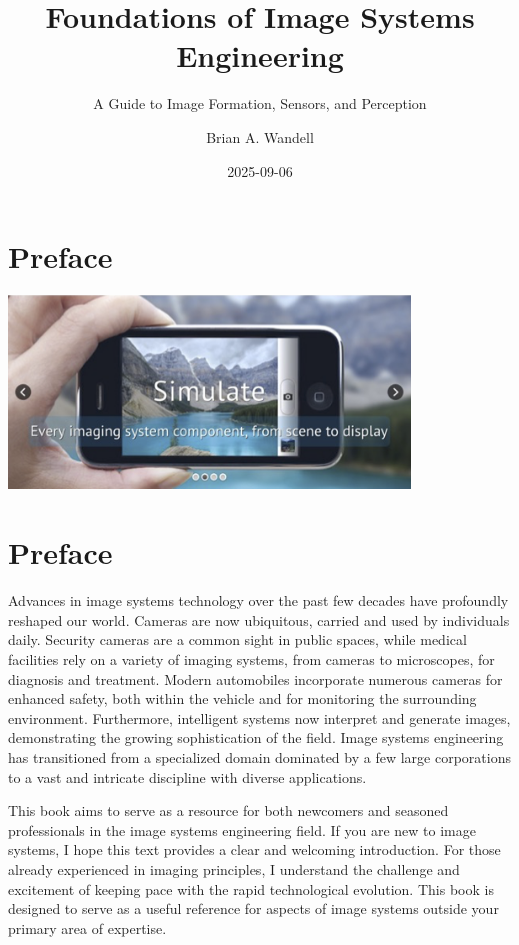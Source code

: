 \documentclass[
  letterpaper,
]{book}
\title{Foundations of Image Systems Engineering}
\subtitle{A Guide to Image Formation, Sensors, and Perception}
\author{Brian A. Wandell}
\date{2025-09-06}
\renewcommand*\contentsname{Table of contents}
\newcommand\contentsname{Table of contents}
\begin{document}
\frontmatter
\maketitle

\renewcommand*\contentsname{Table of contents}
{
\setcounter{tocdepth}{2}
\tableofcontents
}

\mainmatter
{}

\chapter{Preface}\label{preface}

\begin{center}
\includegraphics[width=0.8\textwidth,height=\textheight]{chapters/images/front-simulate.png}
\end{center}


\chapter{Preface}\label{sec-preface}

Advances in image systems technology over the past few decades have
profoundly reshaped our world. Cameras are now ubiquitous, carried and
used by individuals daily. Security cameras are a common sight in public
spaces, while medical facilities rely on a variety of imaging systems,
from cameras to microscopes, for diagnosis and treatment. Modern
automobiles incorporate numerous cameras for enhanced safety, both
within the vehicle and for monitoring the surrounding environment.
Furthermore, intelligent systems now interpret and generate images,
demonstrating the growing sophistication of the field. Image systems
engineering has transitioned from a specialized domain dominated by a
few large corporations to a vast and intricate discipline with diverse
applications.

This book aims to serve as a resource for both newcomers and seasoned
professionals in the image systems engineering field. If you are new to
image systems, I hope this text provides a clear and welcoming
introduction. For those already experienced in imaging principles, I
understand the challenge and excitement of keeping pace with the rapid
technological evolution. This book is designed to serve as a useful
reference for aspects of image systems outside your primary area of
expertise.
\end{document}
